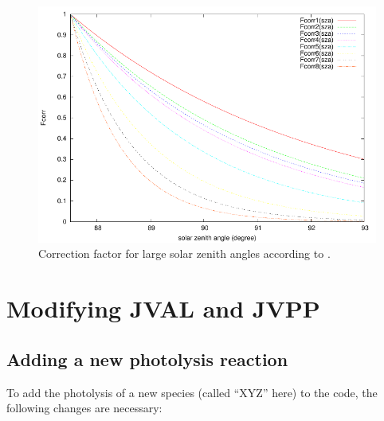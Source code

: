\documentclass[a4paper,twoside]{article}
\begin{document}
\begin{figure}
  \begin{center}
  \includegraphics[width=\columnwidth]{lamago}
  \end{center}
  \caption{Correction factor for large solar zenith angles according to
    \citet{2642}.}
  \label{fig:lamago}
\end{figure}

\section{Modifying JVAL and JVPP}

\subsection{Adding a new photolysis reaction}

To add the photolysis of a new species (called ``XYZ'' here) to the
code, the following changes are necessary:
\end{document}
